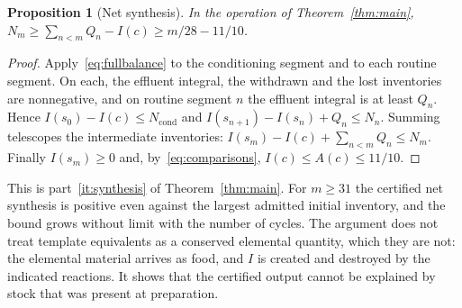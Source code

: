 \documentclass[11pt,a4paper]{article}
\theoremstyle{plain}
\newtheorem{proposition}[theorem]{Proposition}
\theoremstyle{definition}
\theoremstyle{remark}
\newcommand{\Pnet}{N}
\newcommand{\Iv}{I}
\begin{document}
\begin{proposition}[Net synthesis]\label{prop:synthesis}
In the operation of Theorem~\ref{thm:main}, $\Pnet_m\ge\sum_{n<m}Q_n-\Iv(c)\ge m/28-11/10$.
\end{proposition}
\begin{proof}
Apply~\eqref{eq:fullbalance} to the conditioning segment and to each routine segment. On each, the effluent integral, the withdrawn and the lost inventories are nonnegative, and on routine segment $n$ the effluent integral is at least $Q_n$. Hence $\Iv(s_0)-\Iv(c)\le\Pnet_{\mathrm{cond}}$ and $\Iv(s_{n+1})-\Iv(s_n)+Q_n\le\Pnet_n$. Summing telescopes the intermediate inventories: $\Iv(s_m)-\Iv(c)+\sum_{n<m}Q_n\le\Pnet_m$. Finally $\Iv(s_m)\ge0$ and, by~\eqref{eq:comparisons}, $\Iv(c)\le A(c)\le11/10$.
\end{proof}
This is part~\ref{it:synthesis} of Theorem~\ref{thm:main}. For $m\ge31$ the certified net synthesis is positive even against the largest admitted initial inventory, and the bound grows without limit with the number of cycles. The argument does not treat template equivalents as a conserved elemental quantity, which they are not: the elemental material arrives as food, and $\Iv$ is created and destroyed by the indicated reactions. It shows that the certified output cannot be explained by stock that was present at preparation.
\end{document}

